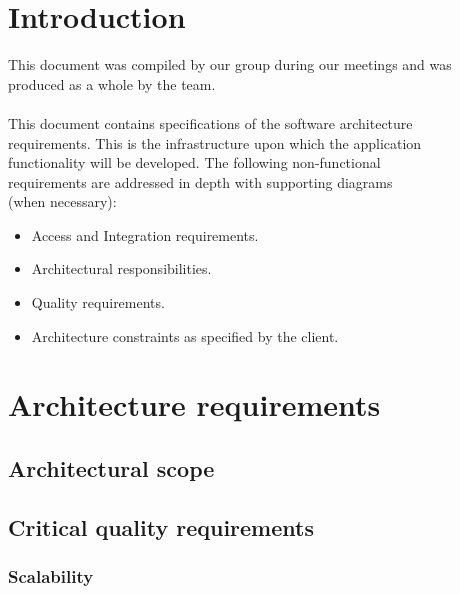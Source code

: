 \documentclass[a4paper,12pt,titlepage]{article}
\begin{document}



\newpage
\tableofcontents


\newpage
\section{Introduction}
\setlength{\voffset}{-3cm}
This document was compiled by our group during our meetings and was produced as a whole by the team.\\\\

This document contains specifications of the software architecture 
\\requirements. This is the infrastructure upon which the application
\\ functionality will be developed. The following non-functional
\\ requirements are addressed in depth with supporting diagrams
\\(when necessary):

\begin{itemize}
	\item Access and Integration requirements.
	\item Architectural responsibilities.
	\item Quality requirements.
	\item Architecture constraints as specified by the client. 
\end{itemize}

\newpage
\setlength{\voffset}{-3cm}

\section{Architecture requirements}
\subsection{Architectural scope}
\newpage
\subsection{Critical quality requirements}
\subsubsection{Scalability}%
	
\newpage
\end{document}
